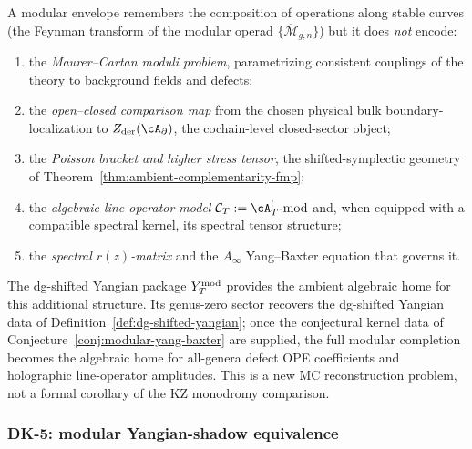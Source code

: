 \begin{remark}
\label{rem:beyond-modular-envelope}
A modular envelope remembers the composition of operations along stable
curves (the Feynman transform of the modular operad
$\{\overline{\mathcal{M}}_{g,n}\}$) but it does \emph{not} encode:
\begin{enumerate}
\item the \emph{Maurer--Cartan moduli problem}, parametrizing
 consistent couplings of the theory to background fields and defects;
\item the \emph{open--closed comparison map} from the chosen physical
 bulk boundary-localization to $Z_{\mathrm{der}}(\cA_\partial)$,
 the cochain-level closed-sector object;
\item the \emph{Poisson bracket and higher stress tensor}, the
 shifted-symplectic geometry of
 Theorem~\ref{thm:ambient-complementarity-fmp};
\item the \emph{algebraic line-operator model}
 $\mathcal{C}_T := \cA_T^!\text{-}\mathrm{mod}$ and, when equipped
 with a compatible spectral kernel, its spectral tensor
 structure;
\item the \emph{spectral $r(z)$-matrix} and the $A_\infty$ Yang--Baxter
 equation that governs it.
\end{enumerate}
The dg-shifted Yangian package $Y^{\mathrm{mod}}_T$ provides the ambient
algebraic home for this additional structure. Its genus-zero
sector recovers the dg-shifted Yangian data of
Definition~\ref{def:dg-shifted-yangian}; once the conjectural
kernel data of Conjecture~\ref{conj:modular-yang-baxter} are
supplied, the full modular completion becomes the algebraic home for
all-genera defect OPE coefficients and holographic line-operator
amplitudes. This is a new MC reconstruction problem, not a formal
corollary of the KZ monodromy comparison.
\end{remark}

\subsubsection{DK-5: modular Yangian-shadow equivalence}

